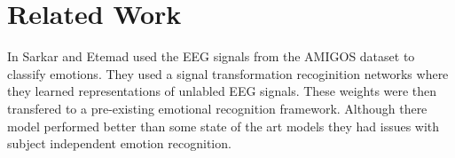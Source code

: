 \section{Related Work}
\label{sec:related_work}
In \cite{sarkar2020selfsupervised} Sarkar and Etemad
used the EEG signals from the AMIGOS dataset to classify emotions.
They used a signal transformation recoginition networks
where they learned representations of unlabled EEG signals.
These weights were then transfered to a pre-existing emotional
recognition framework.
Although there model performed better than some state of the art models
they had issues with subject independent emotion recognition.

\cite{Harper_2020}

